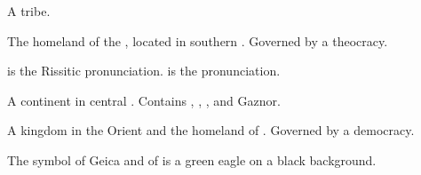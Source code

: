 \begin{gloss}
\begin{comment}
\paragraph{Clictua}
\end{comment}
A \meccaran{} tribe. 







\begin{comment}
\paragraph{Durcac}
\end{comment}
The homeland of the , located in southern . 
Governed by a theocracy. 

 is the Rissitic pronunciation. 
 is the \Velcadian{} pronunciation. 









\begin{comment}
\paragraph{\Galessan}
\end{comment}
\gitem{\Galessan}
A continent in central {\Azmith}. 
Contains , , ,  and {Gaznor}. 









\begin{comment}
\paragraph{Geica}
\end{comment}
A kingdom in the Orient and the homeland of \ClanGeican. 
Governed by a democracy.

The symbol of Geica and of \ClanGeican is a green eagle on a black background.








\end{gloss}
